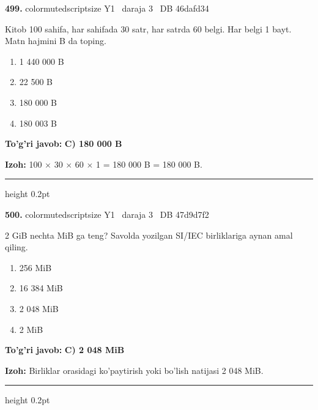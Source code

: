 \documentclass[10pt,a4paper,oneside]{article}
\begin{document}
\noindent\textbf{\color{ink}499.}  {color{muted}scriptsize Y1 \textbullet\ daraja 3 \textbullet\ DB 46dafd34}
\par
Kitob 100 sahifa, har sahifada 30 satr, har satrda 60 belgi. Har belgi 1 bayt. Matn hajmini B da toping.
\begin{enumerate}[label=\Alph*),leftmargin=9mm]
\item 1 440 000 B
\item 22 500 B
\item 180 000 B
\item 180 003 B
\end{enumerate}
\begin{tcolorbox}[enhanced,breakable,colback=teal!4,colframe=teal!50!black,boxrule=0.5pt,arc=1.1mm,left=3mm,right=3mm,top=1.7mm,bottom=1.7mm,before skip=2mm,after skip=2mm]
\textbf{\color{teal}To'g'ri javob:} \textbf{C) 180 000 B}
\par\smallskip
\textbf{Izoh:} 100 \ensuremath{\times} 30 \ensuremath{\times} 60 \ensuremath{\times} 1 = 180 000 B = 180 000 B.
\end{tcolorbox}
\vspace{2mm}\hrule height 0.2pt \vspace{3mm}

\noindent\textbf{\color{ink}500.}  {color{muted}scriptsize Y1 \textbullet\ daraja 3 \textbullet\ DB 47d9d7f2}
\par
2 GiB nechta MiB ga teng? Savolda yozilgan SI/IEC birliklariga aynan amal qiling.
\begin{enumerate}[label=\Alph*),leftmargin=9mm]
\item 256 MiB
\item 16 384 MiB
\item 2 048 MiB
\item 2 MiB
\end{enumerate}
\begin{tcolorbox}[enhanced,breakable,colback=teal!4,colframe=teal!50!black,boxrule=0.5pt,arc=1.1mm,left=3mm,right=3mm,top=1.7mm,bottom=1.7mm,before skip=2mm,after skip=2mm]
\textbf{\color{teal}To'g'ri javob:} \textbf{C) 2 048 MiB}
\par\smallskip
\textbf{Izoh:} Birliklar orasidagi ko'paytirish yoki bo'lish natijasi 2 048 MiB.
\end{tcolorbox}
\vspace{2mm}\hrule height 0.2pt \vspace{3mm}
\end{document}
